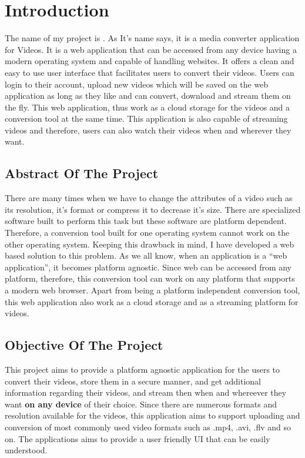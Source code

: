 \section{Introduction}
	The name of my project is \textbf{\projectname}.
	\vs
	As It’s name says, it is a media converter application for Videos.
	It is a web application that can be accessed from any device having a modern operating system and capable of handling websites.
	It offers a clean and easy to use user interface that facilitates users to convert their videos.
	\vs
	Users can login to their account, upload new videos which will be saved on the web application as long as they like and can convert, download and stream them on the fly.
	\vs
	This web application, thus work as a cloud storage for the videos and a conversion tool at the same time.
	This application is also capable of streaming videos and therefore, users can also watch their videos when and wherever they want.
	\vs	
	\subsection{Abstract Of The Project}
	\vs
	There are many times when we have to change the attributes of a video such as its resolution, it’s format or compress it to decrease it’s size. There are specialized software built to perform this task but these software are platform dependent. Therefore, a conversion tool built for one operating system cannot work on the other operating system.
	\vs
	Keeping this drawback in mind, I have developed a web based solution to this problem. As we all know, when an application is a “web application”, it becomes platform agnostic. Since web can be accessed from any platform, therefore, this conversion tool can work on any platform that supports a modern web browser.
	Apart from being a platform independent conversion tool, this web application also work as a cloud storage and as a streaming platform for videos.
	\vs
	\subsection{Objective Of The Project}
	\vs
	This project aims to provide a platform agnostic application for the users to convert their videos, store them in a secure manner, and get additional information regarding their videos, and stream then when and whereever they want \textbf{on any device} of their choice.
	\vs
	Since there are numerous formats and resolution available for the videos, this application aims to support uploading and conversion of most commonly used video formats such as .mp4, .avi, .flv and so on.
	The applications aims to provide a user friendly UI that can be easily understood.
